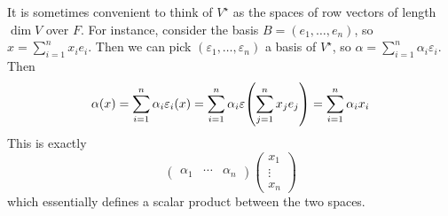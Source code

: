 \begin{remark}
	It is sometimes convenient to think of \( V^\star \) as the spaces of row vectors of length \( \dim V \) over \( F \).
	For instance, consider the basis \( B = (e_1, \dots, e_n) \), so \( x = \sum_{i=1}^n x_i e_i \).
	Then we can pick \( (\varepsilon_1, \dots, \varepsilon_n) \) a basis of \( V^\star \), so \( \alpha = \sum_{i=1}^n \alpha_i \varepsilon_i \).
	Then
	\[
		\alpha(x) = \sum_{i=1}^n \alpha_i \varepsilon_i(x) = \sum_{i=1}^n \alpha_i \varepsilon\qty(\sum_{j=1}^n x_j e_j) = \sum_{i=1}^n \alpha_i x_i
	\]
	This is exactly
	\[
		\begin{pmatrix} \alpha_1 & \cdots & \alpha_n \end{pmatrix} \begin{pmatrix} x_1 \\ \vdots \\ x_n \end{pmatrix}
	\]
	which essentially defines a scalar product between the two spaces.
\end{remark}

